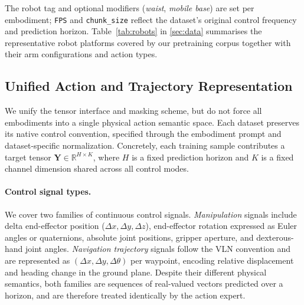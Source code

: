 \documentclass{llmxive}
\begin{document}
\noindent The robot tag and optional modifiers (\emph{waist}, \emph{mobile base}) are set per
embodiment; \texttt{FPS} and \texttt{chunk\_size} reflect the dataset's original control
frequency and prediction horizon.
Table~\ref{tab:robots} in \cref{sec:data} summarises the representative robot
platforms covered by our pretraining corpus together with their arm
configurations and action types.


\subsection{Unified Action and Trajectory Representation}
\label{sec:unified-representation}
We unify the tensor interface and masking scheme, but do not force all embodiments into a single physical action semantic space. Each dataset preserves its native control convention, specified through the embodiment prompt and dataset-specific normalization.
Concretely, each training sample contributes a target tensor $\mathbf{Y} \in \mathbb{R}^{H \times K}$, where $H$ is a fixed prediction horizon and $K$ is a fixed channel dimension shared across all control modes.


\paragraph{Control signal types.}
We cover two families of continuous control signals.
\textit{Manipulation} signals include delta end-effector position ($\Delta x, \Delta y, \Delta z$), end-effector rotation expressed as Euler angles or quaternions, absolute joint positions, gripper aperture, and dexterous-hand joint angles.
\textit{Navigation trajectory} signals follow the VLN convention and are represented as $(\Delta x, \Delta y, \Delta\theta)$ per waypoint, encoding relative displacement and heading change in the ground plane.
Despite their different physical semantics, both families are sequences of real-valued vectors predicted over a horizon, and are therefore treated identically by the action expert.
\end{document}

